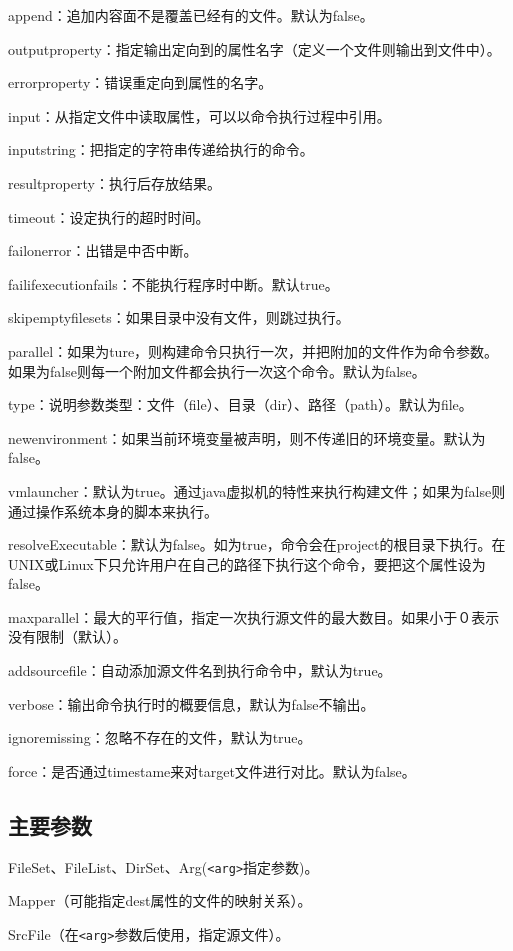 append：追加内容面不是覆盖已经有的文件。默认为false。

outputproperty：指定输出定向到的属性名字（定义一个文件则输出到文件中）。

errorproperty：错误重定向到属性的名字。

input：从指定文件中读取属性，可以以命令执行过程中引用。

inputstring：把指定的字符串传递给执行的命令。

resultproperty：执行后存放结果。

timeout：设定执行的超时时间。

failonerror：出错是中否中断。

failifexecutionfails：不能执行程序时中断。默认true。

skipemptyfilesets：如果目录中没有文件，则跳过执行。

parallel：如果为ture，则构建命令只执行一次，并把附加的文件作为命令参数。如果为false则每一个附加文件都会执行一次这个命令。默认为false。

type：说明参数类型：文件（file）、目录（dir）、路径（path）。默认为file。

newenvironment：如果当前环境变量被声明，则不传递旧的环境变量。默认为false。

vmlauncher：默认为true。通过java虚拟机的特性来执行构建文件；如果为false则通过操作系统本身的脚本来执行。

resolveExecutable：默认为false。如为true，命令会在project的根目录下执行。在UNIX或Linux下只允许用户在自己的路径下执行这个命令，要把这个属性设为false。

maxparallel：最大的平行值，指定一次执行源文件的最大数目。如果小于０表示没有限制（默认）。

addsourcefile：自动添加源文件名到执行命令中，默认为true。

verbose：输出命令执行时的概要信息，默认为false不输出。

ignoremissing：忽略不存在的文件，默认为true。

force：是否通过timestame来对target文件进行对比。默认为false。

\subsection{主要参数}

FileSet、FileList、DirSet、Arg(\verb|<arg>|指定参数)。

Mapper（可能指定dest属性的文件的映射关系）。

SrcFile（在\verb|<arg>|参数后使用，指定源文件）。

